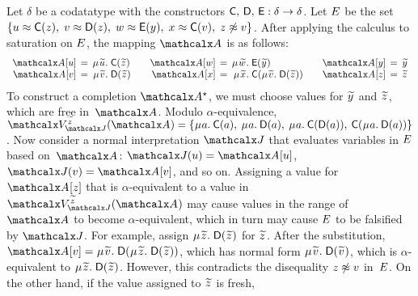 \begin{examplex}
Let $\delta$ be a codatatype with the constructors $\textsf{C},\, \textsf{D},\, \textsf{E} :\delta \rightarrow \delta$.
Let $E$ be the set
$\{
u \approx \textsf{C}( z ),\;
v \approx \textsf{D}( z ),\;
w \approx \textsf{E}( y ),\;
x \approx \textsf{C}( v ),\;
z \not\approx v
\}$.
After applying the calculus to saturation on $E$,
the mapping $\Val$ is as follows:
\[\begin{array}{r@{}c@{}r@{}l@{\qquad}r@{}c@{}r@{}l@{\qquad}r@{}c@{}l}
\Val \ec{u} & {}\,=\,{} & \MU {\Varec{u}}.\; & \const{C}( {\Varec{z}} ) &
\Val \ec{w} & = & \MU {\Varec{w}}.\; & \const{E}( {\Varec{y}} ) &
\Val \ec{y} & {}\,=\,{} & {\Varec{y}} \\
\Val \ec{v} & = & \MU {\Varec{v}}.\; & \const{D}( {\Varec{z}} ) &
\Val \ec{x} & {}\,=\,{} & \MU {\Varec{x}}.\; & \const{C}( \MU {\Varec{v}}.\; \const{D}( {\Varec{z}} ) ) &
\Val \ec{z} & = & {\Varec{z}}
\end{array}\]
%
To construct a completion $\ValC$, we must choose values for ${\Varec{y}}$ and ${\Varec{z}}$,
which are free in~$\Val$.
Modulo $\alpha$-equivalence, $\smash{\BAD_{\smash{\J}}^{{\Varec{z}}}( \Val )} =
\{
\MU a.\: \const{C}( a ),\:
\MU a.\: \const{D}( a ),\allowbreak\:
\MU a.\: \const{C}( \const{D}( a )),\allowbreak\:
\const{C}( \MU a.\: \const{D}( a ))
\}
$.
Now consider a normal interpretation $\J$ that evaluates variables in $E$ based on~$\Val$:
$\interp{\J}{u} = \Val \ec{u}$, $\interp{\J}{v} = \Val \ec{v}$, and so on.
Assigning a value for $\Val \ec{z}$ that is $\alpha$-equivalent to a value in $\BAD_{\smash{\J}}^{{\Varec{z}}}( \Val )$
may cause values in the range of $\Val$ to become $\alpha$-equivalent,
which in turn may cause $E$ to be falsified by $\J$.
For example, assign $\MU {\Varec{z}}.\; \const{D}( {\Varec{z}} )$ for ${\Varec{z}}$.
After the substitution, $\Val \ec{v} = \MU {\Varec{v}}.\; \const{D}( \MU {\Varec{z}}.\; \const{D}( {\Varec{z}} ) )$,
which has normal form $\MU {\Varec{v}}.\; \const{D}( {\Varec{v}} )$,
which is $\alpha$-equivalent to $\MU {\Varec{z}}.\; \const{D}( {\Varec{z}} )$.
However, this contradicts the disequality $z \not\approx v$ in~$E$.
On the other hand, if the value assigned to ${\Varec{z}}$ is fresh, %

\end{examplex}
